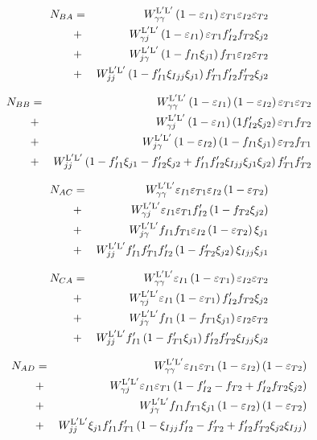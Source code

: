   \begin{eqnarray}
    N_{BA} &=& \WyyLL \left(1-\eIone\right) \eTone \eItwo \eTtwo \nonumber \\
    &+& \WyjLL\left(1-\eIone \right)\eTone \fIptwo \fTtwo  \xijtwo   \nonumber \\
    &+& \WjyLL \left(1-\fIone  \xijone\right)\fTone \eItwo \eTtwo   \nonumber \\
    &+& \WjjLL\left(1-\fIpone\xiIjj\xijone\right) \fTpone \fIptwo \fTptwo\xijtwo
  \end{eqnarray}
  
  \begin{eqnarray}
    N_{BB} &=& \WyyLL \left(1-\eIone\right)\left(1-\eItwo\right)\eTone \eTtwo  \nonumber \\
    &+& \WyjLL \left(1-\eIone\right)\left(1 \fIptwo \xijtwo\right)\eTone \fTtwo    \nonumber \\
    &+& \WjyLL\left(1-\eItwo\right)\left(1-\fIone \xijone\right)\eTtwo \fTone    \nonumber \\
    &+& \WjjLL\left(1-\fIpone\xijone-\fIptwo\xijtwo+\fIpone\fIptwo\xiIjj \xijone\xijtwo\right)\fTpone\fTptwo
  \end{eqnarray}
  
  \begin{eqnarray}
    N_{AC} &=& \WyyLL  \eIone \eTone \eItwo\left(1-  \eTtwo\right) \nonumber \\
    &+& \WyjLL\eIone \eTone \fIptwo    \left(1-\fTtwo \xijtwo  \right) \nonumber \\
    &+& \WjyLL \fIone \fTone \eItwo  \left(1-\eTtwo   \right)\xijone \nonumber \\
    &+& \WjjLL\fIpone\fTpone \fIptwo\left(1- \fTptwo\xijtwo\right)\xiIjj \xijone
  \end{eqnarray}
  
  \begin{eqnarray}
    N_{CA} &=& \WyyLL \eIone \left(1-\eTone\right) \eItwo \eTtwo \nonumber \\
    &+& \WyjLL\eIone \left(1-\eTone   \right)\fIptwo \fTtwo   \xijtwo  \nonumber \\
    &+& \WjyLL \fIone  \left(1-\fTone \xijone  \right) \eItwo \eTtwo\nonumber \\
    &+& \WjjLL\fIpone\left(1-\fTpone\xijone\right)\fIptwo \fTptwo\xiIjj\xijtwo
  \end{eqnarray}
  
  \begin{eqnarray}
    N_{AD} &=& \WyyLL \eIone \eTone \left(1-\eItwo\right)\left(1-\eTtwo\right) \nonumber \\
    &+& \WyjLL\eIone \eTone  \left(1-\fIptwo  -\fTtwo  +\fIptwo\fTtwo   \xijtwo  \right)\nonumber \\
    &+& \WjyLL \fIone \fTone \xijone \left(1-\eItwo\right)\left(1-\eTtwo\right) \nonumber \\
    &+& \WjjLL\xijone\fIpone \fTpone \left(1-\xiIjj\fIptwo- \fTptwo+\fIptwo \fTptwo\xijtwo\xiIjj\right)
  \end{eqnarray}
  
